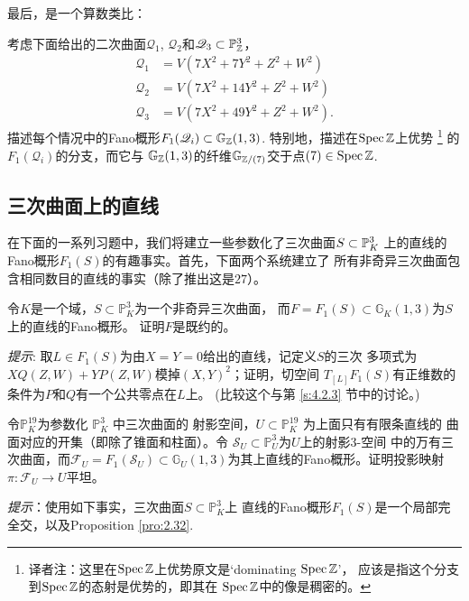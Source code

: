 最后，是一个算数类比：

\begin{exe}\label{exe:4.72}
考虑下面给出的二次曲面$\mathscr Q_1$, $\mathscr Q_2$和$\mathscr Q_3\subset \P_\zz^3$，
\[
\begin{aligned} \mathscr{Q}_{1} &=V\left(7 X^{2}+7 Y^{2}+Z^{2}+W^{2}\right) \\ \mathscr{Q}_{2} &=V\left(7 X^{2}+14 Y^{2}+Z^{2}+W^{2}\right) \\ \mathscr{Q}_{3} &=V\left(7 X^{2}+49 Y^{2}+Z^{2}+W^{2}\right).\end{aligned}
\]
描述每个情况中的Fano概形$F_1(\mathscr Q_i)\subset \mathbb G_\zz(1,3)$.
特别地，描述在$\spec \zz$上优势%
\footnote{
	译者注：这里在$\spec \zz$上优势原文是`dominating $\spec \zz$'，
	应该是指这个分支到$\spec \zz$的态射是优势的，即其在
	$\spec \zz$中的像是稠密的。
}%
的$F_1(\mathscr Q_i)$的分支，而它与
$\mathbb G_\zz(1,3)$的纤维$\mathbb G_{\zz/(7)}$交于点$(7)\in \spec \zz$.
\end{exe}

\subsection{三次曲面上的直线}

在下面的一系列习题中，我们将建立一些参数化了三次曲面$S\subset \P_K^3$
上的直线的Fano概形$F_1(S)$的有趣事实。首先，下面两个系统建立了
所有非奇异三次曲面包含相同数目的直线的事实（除了推出这是$27$）。


\begin{exe}\label{exe:4.73}
令$K$是一个域，$S \subset \mathbb{P}_{K}^{3}$为一个非奇异三次曲面，
而$F=F_{1}(S) \subset \mathbb{G}_{K}(1,3)$为$S$上的直线的Fano概形。 
证明$F$是既约的。

\emph{提示}: 取$L \in F_{1}(S)$为由$X=Y=0$给出的直线，记定义$S$的三次
多项式为$X Q(Z, W)+Y P(Z, W)$模掉$(X, Y)^{2}$；证明，切空间
$T_{[L]} F_{1}(S)$有正维数的条件为$P$和$Q$有一个公共零点在$L$上。
(比较这个与第 \ref{s:4.2.3} 节中的讨论。)
\end{exe}

\begin{exe}\label{exe:4.74}
令$\mathbb{P}_{K}^{19}$为参数化 $\mathbb{P}_{K}^{3}$ 中三次曲面的
射影空间，$U \subset \mathbb{P}_{K}^{19}$ 为上面只有有限条直线的
曲面对应的开集（即除了锥面和柱面）。令
$\mathscr{S}_{U} \subset \mathbb{P}_{U}^{3}$为$U$上的射影$3$-空间
中的万有三次曲面，而$\mathscr{F}_{U}=F_{1}\left(\mathscr{S}_{U}\right) 
\subset \mathbb{G}_{U}(1,3)$为其上直线的Fano概形。证明投影映射
$\pi: \mathscr{F}_{U} \rightarrow U$平坦。

\emph{提示}：使用如下事实，三次曲面$S \subset \mathbb{P}_{K}^{3}$上
直线的Fano概形$F_{1}(S)$是一个局部完全交，以及Proposition \ref{pro:2.32}.
\end{exe}

